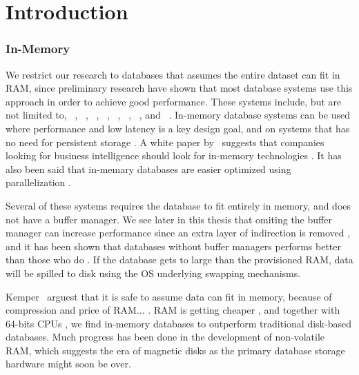 \chapter{Introduction}
\label{chap:introduction}
\clearpage




\subsection{In-Memory}
\label{sub:In-Memory}
We restrict our research to databases that assumes the entire dataset can fit in RAM, since preliminary research have shown that most database systems use this approach in order to achieve good performance. These systems include, but are not limited to, \oracle~\cite{Lahiri2015-mz}, \saph~\cite{Farber2012-vh}, \gorilla~\cite{Pelkonen2015-ko}, \qlikview~\cite{Qlik2011-ef}, \tableau~\cite{Kamkolkar2015-iq}, \monetdb~\cite{Boncz2002-yj}, \blink~\cite{Barber2012-xt}, and \sapnw~\cite{Lemke2010-is}. In-memory database systems can be used where performance and low latency is a key design goal, and on systems that has no need for persistent storage \cite{Zicari2012-is}. A white paper by \qlikview~suggests that companies looking for business intelligence should look for in-memory technologies \cite{Bereanu2010-tj}. It has also been said that in-memary databases are easier optimized using parallelization \cite{Psaroudakis2013-fn}.

Several of these systems requires the database to fit entirely in memory, and does not have a buffer manager. We see later in this thesis that omiting the buffer manager can increase performance since an extra layer of indirection is removed \cite{Graefe2014-ds}, and it has been shown that databases without buffer managers performs better than those who do \cite{Ferrari2012-hm}. If the database gets to large than the provisioned RAM, data will be spilled to disk using the OS underlying swapping mechanisms.  

Kemper \ea~arguest that it is safe to assume data can fit in memory, because of compression and price of RAM... \cite{Kemper2011-ap} . RAM is getting cheaper \cite{Exasol2014-xh}, and together with 64-bits CPUs \cite{Delaney2014-ip}, we find in-memory databases to outperform traditional disk-based databases. Much progress has been done in the development of non-volatile RAM, which suggests the era of magnetic disks as the primary database storage hardware might soon be over.

